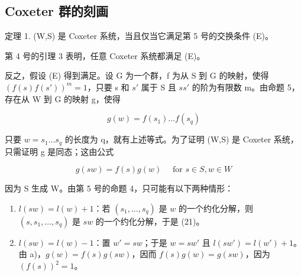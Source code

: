 \subsection{Coxeter 群的刻画}

定理 1. (W,S) 是 Coxeter 系统，当且仅当它满足第 5 号的交换条件 (E)。

第 4 号的引理 3 表明，任意 Coxeter 系统都满足 (E)。

反之，假设 (E) 得到满足。设 G 为一个群，f 为从 S 到 G 的映射，使得 \((f(s)f(s'))^{m}=1\)，只要 s 和 \(s'\) 属于 S 且 \(ss'\) 的阶为有限数 m。由命题 5，存在从 W 到 G 的映射 g，使得

\[
g (w) = f (s _ {1}) \dots f (s _ {q})\tag{20}
\]

只要 \(w = s_{1} \ldots s_{q}\) 的长度为 q，就有上述等式。为了证明 (W,S) 是 Coxeter 系统，只需证明 g 是同态；这由公式

\[
g (s w) = f (s) g (w) \quad \text { for } s \in S, w \in W\tag{21}
\]

因为 S 生成 W。由第 5 号的命题 4，只可能有以下两种情形：

\begin{enumerate}
\def\labelenumi{\alph{enumi})}
\item
  \(l(sw) = l(w) + 1\)：若 \((s_1, \ldots, s_q)\) 是 \(w\) 的一个约化分解，则 \((s, s_1, \ldots, s_q)\) 是 \(sw\) 的一个约化分解，于是 (21)。
\item
  \(l(sw) = l(w) - 1\)：置 \(w' = sw\)；于是 \(w = sw'\) 且 \(l(sw') = l(w') + 1\)。由 a)，\(g(w) = f(s)g(sw)\)，因而 \(f(s)g(w) = g(sw)\)，因为 \((f(s))^{2} = 1\)。
\end{enumerate}

